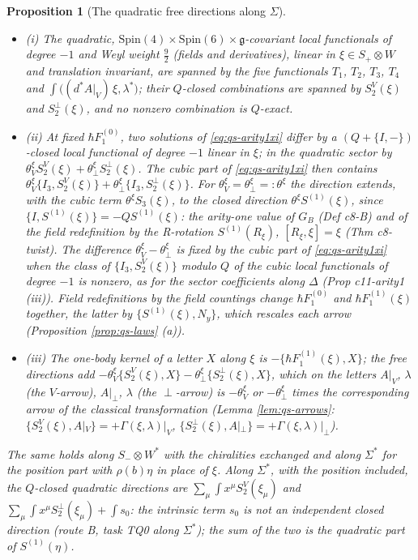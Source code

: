 \documentclass[11pt]{article}
\numberwithin{equation}{section}
\theoremstyle{plain}
\newtheorem{proposition}[theorem]{Proposition}
\theoremstyle{definition}
\newcommand{\Ap}{A|_{\perp}}
\newcommand{\AV}{A|_V}
\begin{document}
\begin{proposition}[The quadratic free directions along $\Sigma$]
\label{prop:qs-freexi}
\begin{itemize}
\item (i) The quadratic, $\mathrm{Spin}(4)\times\mathrm{Spin}(6)\times\mathfrak g$-covariant local functionals of degree $-1$ and Weyl weight $\tfrac92$ (fields and derivatives), linear in $\xi\in S_+\otimes W$ and translation invariant, are spanned by the five functionals $T_1$, $T_2$, $T_3$, $T_4$ and $\int\big((d^*A|_V)\,\xi,\lambda^*\big)$; their $Q$-closed combinations are spanned by $S^V_2(\xi)$ and $S^\perp_2(\xi)$, and no nonzero combination is $Q$-exact.
\item (ii) At fixed $\hbar F_1^{(0)}$, two solutions of \eqref{eq:qs-arity1xi} differ by a $(Q+\{I,-\})$-closed local functional of degree $-1$ linear in $\xi$; in the quadratic sector by $\theta^\xi_VS^V_2(\xi)+\theta^\xi_\perp S^\perp_2(\xi)$. The cubic part of \eqref{eq:qs-arity1xi} then contains $\theta^\xi_V\{I_3,S^V_2(\xi)\}+\theta^\xi_\perp\{I_3,S^\perp_2(\xi)\}$. For $\theta^\xi_V=\theta^\xi_\perp=:\theta^\xi$ the direction extends, with the cubic term $\theta^\xi S_3(\xi)$, to the closed direction $\theta^\xi S^{(1)}(\xi)$, since $\{I,S^{(1)}(\xi)\}=-QS^{(1)}(\xi)$: the arity-one value of $G_B$ (Def c8-B) and of the field redefinition by the R-rotation $S^{(1)}(R_\xi)$, $[R_\xi,\xi]=\xi$ (Thm c8-twist). The difference $\theta^\xi_V-\theta^\xi_\perp$ is fixed by the cubic part of \eqref{eq:qs-arity1xi} when the class of $\{I_3,S^V_2(\xi)\}$ modulo $Q$ of the cubic local functionals of degree $-1$ is nonzero, as for the sector coefficients along $\Delta$ (Prop c11-arity1 (iii)). Field redefinitions by the field countings change $\hbar F_1^{(0)}$ and $\hbar F_1^{(1)}(\xi)$ together, the latter by $\{S^{(1)}(\xi),N_y\}$, which rescales each arrow (Proposition \ref{prop:qs-laws} (a)).
\item (iii) The one-body kernel of a letter $X$ along $\xi$ is $-\{\hbar F_1^{(1)}(\xi),X\}$; the free directions add $-\theta^\xi_V\{S^V_2(\xi),X\}-\theta^\xi_\perp\{S^\perp_2(\xi),X\}$, which on the letters $\AV$, $\lambda$ (the $V$-arrow), $\Ap$, $\lambda$ (the $\perp$-arrow) is $-\theta^\xi_V$ or $-\theta^\xi_\perp$ times the corresponding arrow of the classical transformation (Lemma \ref{lem:qs-arrows}: $\{S^V_2(\xi),\AV\}=+\Gamma(\xi,\lambda)|_V$, $\{S^\perp_2(\xi),\Ap\}=+\Gamma(\xi,\lambda)|_\perp$).
\end{itemize}
The same holds along $S_-\otimes W^*$ with the chiralities exchanged and along $\Sigma^*$ for the position part with $\rho(b)\eta$ in place of $\xi$. Along $\Sigma^*$, with the position included, the $Q$-closed quadratic directions are $\sum_\mu\int x^\mu S^V_2(\xi_\mu)$ and $\sum_\mu\int x^\mu S^\perp_2(\xi_\mu)+\int s_0$: the intrinsic term $s_0$ is not an independent closed direction (route B, task TQ0 along $\Sigma^*$); the sum of the two is the quadratic part of $S^{(1)}(\eta)$.
\end{proposition}
\end{document}
